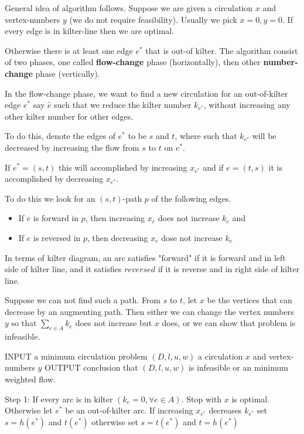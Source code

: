 \documentclass[10pt, twocolumn]{book}
\theoremstyle{definition}
\theoremstyle{plain}
\theoremstyle{remark}
\begin{document}
			General idea of algorithm follows. Suppose we are given a circulation $x$ and vertex-numbers $y$ (we do not require feasibility). Usually we pick $x=0, y=0$. If every edge is in kilter-line then we are optimal.

			Otherwise there is at least one edge $e^*$ that is out-of kilter. The algorithm consist of two phases, one called \textbf{flow-change} phase (horizontally), then other \textbf{number-change} phase (vertically).

			In the flow-change phase, we want to find a new circulation for an out-of-kilter edge $e^*$ say $\hat{e}$ such that we reduce the kilter number $k_{e^*}$, without increasing any other kilter number for other edges.

			To do this, denote the edges of $e^*$ to be $s$ and $t$, where such that $k_{e^*}$ will be decreased by increasing the flow from $s$ to $t$ on $e^*$.

			If $e^*=(s, t)$ this will accomplished by increasing $x_{e^*}$ and if $e=(t, s)$ it is accomplished by decreasing $x_{e^*}$. 

			To do this we look for an $(s, t)$-path $p$ of the following edges.

			\begin{itemize}
				\item If $e$ is forward in $p$, then increasing $x_e$ does not increase $k_e$ and
				\item If $e$ is reversed in $p$, then decreasing $x_e$ dose not increase $k_e$
			\end{itemize}

			In terms of kilter diagram, an arc satisfies "forward" if it is forward and in left side of kilter line, and it satisfies $reversed$ if it is reverse and in right side of kilter line.

			Suppose we can not find such a path. From $s$ to $t$, let $x$ be the vertices that can decrease by an augmenting path. Then either we can change the vertex numbers $y$ so that $\sum_{e\in A} k_e$ does not increase but $x$ does, or we can show that problem is infeasible.

			INPUT a minimum circulation problem $(D, l, u, w)$ a circulation $x$ and vertex-numbers $y$
			OUTPUT conclusion that $(D, l, u, w)$ is infeasible or an minimum weighted flow.

			Step 1: If every arc is in kilter $(k_e = 0, \forall e\in A)$. Stop with $x$ is optimal. Otherwise let $e^*$ be an out-of-kilter arc. If increasing $x_{e^*}$ decreases $k_{e^*}$ set $s=h(e^*)$ and $t(e^*)$ otherwise set $s=t(e^*)$ and $t=h(e^*)$
\end{document}
